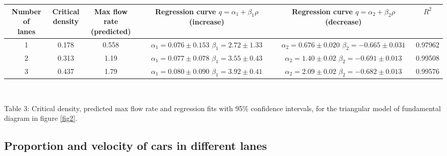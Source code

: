 \documentclass[a4paper,12pt]{article}
\begin{document}
\begin{center}
\def\arraystretch{2.7}
\begin{tabular}{ |c|c|c|c|c|c| } 
 \hline
	\makecell{Number of \\lanes} & \makecell{Critical\\ density} &\makecell{Max flow rate \\ (predicted)} & \makecell{Regression curve \\$q=\alpha_1+\beta_1\rho$ \\(increase)} & \makecell{Regression curve \\ $q=\alpha_2+\beta_2\rho$  \\(decrease)} & $R^2$ \\
 \hline
	 1 & 0.178 & 0.558 &\makecell{$\alpha_1 = 0.076 \pm 0.153$ \\ $\beta_1 = 2.72 \pm 1.33$} & \makecell{$\alpha_2 = 0.676 \pm 0.020$ \\ $\beta_2 = -0.665 \pm 0.031$} & 0.97962  \\
	 2 & 0.313 & 1.19 & \makecell{$\alpha_1 = 0.077 \pm 0.078$ \\ $\beta_1 = 3.55 \pm 0.43$} & 
	 \makecell{$\alpha_2 = 1.40 \pm 0.02$ \\ $\beta_2 = -0.691 \pm 0.013$}  & 0.99508 \\
	 3 & 0.437 & 1.79 & \makecell{$\alpha_1 = 0.080 \pm 0.090$ \\ $\beta_1 = 3.92 \pm 0.41$} & 
	 \makecell{$\alpha_2 = 2.09 \pm 0.02$ \\ $\beta_2 = -0.682 \pm 0.013$} & 0.99576 \\
 \hline
\end{tabular}\\
\end{center}
Table 3: Critical density, predicted max flow rate and regression fits with 95\% confidence intervals, for the triangular model of fundamental diagram in figure \ref{fig2}.


\subsection{Proportion and velocity of cars in different lanes}
\end{document}
